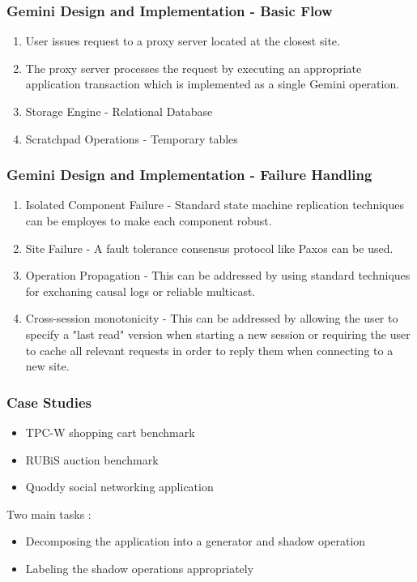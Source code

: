 \documentclass{beamer}
\begin{document}

\begin{frame}
\frametitle{Gemini Design and Implementation - Basic Flow}
\begin{enumerate}
\item User issues request to a proxy server located at the closest site.
\item The proxy server processes the request by executing an appropriate application transaction which is implemented as a single Gemini operation. 
\item Storage Engine - Relational Database
\item Scratchpad Operations - Temporary tables
\end{enumerate}
\end{frame}






\begin{frame}
\frametitle{Gemini Design and Implementation - Failure Handling}
\begin{enumerate}
\item Isolated Component Failure - Standard state machine replication techniques can be employes to make each component robust.
\item Site Failure - A fault tolerance consensus protocol like Paxos can be used.
\item Operation Propagation - This can be addressed by using standard techniques for exchaning causal logs or reliable multicast.
\item Cross-session monotonicity - This can be addressed by allowing the user to specify a "last read" version when starting a new session or requiring the user to cache all relevant requests in order to reply them when connecting to a new site.
\end{enumerate}
\end{frame}


\begin{frame}
\frametitle{Case Studies}
\begin{itemize}
\item TPC-W shopping cart benchmark
\item RUBiS auction benchmark
\item Quoddy social networking application
\end{itemize} 
Two main tasks :
\begin{itemize}
\item Decomposing the application into a generator and shadow operation
\item Labeling the shadow operations appropriately
\end{itemize}
\end{frame}
\end{document}
